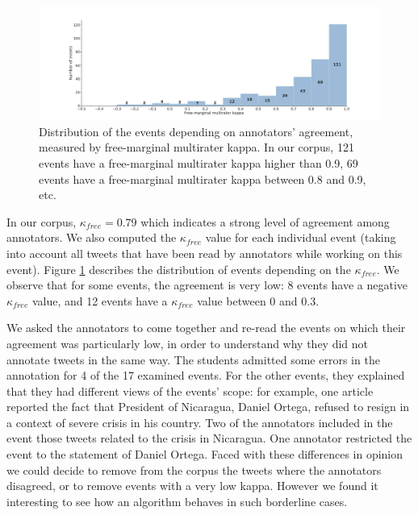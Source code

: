 \begin{figure}
\begin{center}
\includegraphics[width=1\textwidth]{figures/HistogramEventsDistributionByKappa.pdf}
\end{center}

\caption[Distribution of the events depending on annotators' agreement, measured by free-marginal multirater kappa]{Distribution of the events depending on annotators' agreement, measured by free-marginal multirater kappa. In our corpus, 121 events have a free-marginal multirater kappa higher than 0.9, 69 events have a free-marginal multirater kappa between 0.8 and 0.9, etc.}
\label{Figure:HistogramEventsByKappa}
\end{figure}

In our corpus, $\kappa_{free} = 0.79$ which indicates a strong level of agreement among annotators. We also computed the $\kappa_{free}$ value for  each individual event (taking into account all tweets that have been read by annotators while working on this event). Figure \ref{Figure:HistogramEventsByKappa} describes the distribution of events depending on the $\kappa_{free}$. We observe that for some events, the agreement is very low: 8 events have a negative $\kappa_{free}$ value, and 12 events have a $\kappa_{free}$ value between 0 and 0.3.


We asked the annotators to come together and re-read the events on which their agreement was particularly low, in order to understand why they did not annotate tweets in the same way. The students admitted some errors in the annotation for 4 of the 17 examined events. For the other events, they explained that they had different views of the events' scope: for example, one article reported the fact that President of Nicaragua, Daniel Ortega, refused to resign in a context of severe crisis in his country. Two of the annotators included in the event those tweets related to the crisis in Nicaragua. One annotator restricted the event to the statement of Daniel Ortega. Faced with these differences in opinion we could decide to remove from the corpus the tweets where the annotators disagreed, or to remove events with a very low kappa. However we found it interesting to see how an algorithm behaves in such borderline cases.


